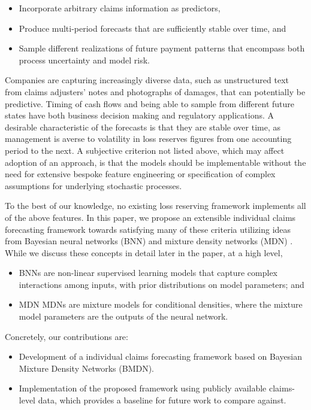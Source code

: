 \documentclass{article}
\begin{document}
\begin{itemize}
	\item Incorporate arbitrary claims information as predictors,
	\item Produce multi-period forecasts that are sufficiently stable over time, 
	and
	\item Sample different realizations of future payment patterns that encompass 
	both process uncertainty and model risk.
\end{itemize}
Companies are capturing increasingly diverse data, such as unstructured text 
from claims adjusters' notes and photographs of damages, that can potentially 
be predictive. Timing of cash flows and being able to sample from different 
future states have both business decision making and regulatory applications. A 
desirable characteristic of the forecasts is that they are stable over time, as 
management is averse to volatility in loss reserves figures from one accounting 
period to the next. A subjective criterion not listed above, which may affect
adoption of an approach, is that the models should be implementable without the
need for extensive bespoke feature engineering or specification of complex 
assumptions for underlying stochastic processes.

To the best of our knowledge, no existing loss reserving framework implements 
all of the above features. In this paper, we propose an extensible individual 
claims forecasting framework towards satisfying many of these criteria utilizing
ideas from Bayesian neural networks (BNN) \cite{nealBayesianLearning2012} and 
mixture density networks (MDN) \cite{bishopMixtureDensity1994}. While we discuss
these concepts in detail later in the paper, at a high level,

\begin{itemize}
  \item BNNs are non-linear supervised learning models that capture complex 
  interactions among inputs, with prior distributions on model parameters; and
  \item MDN MDNs are mixture models for conditional densities, where the mixture
  model parameters are the outputs of the neural network.
\end{itemize}
Concretely, our contributions are:

\begin{itemize}
	\item Development of a individual claims forecasting framework based on 
	Bayesian Mixture Density Networks (BMDN).
	\item Implementation of the proposed framework using publicly available 
	claims-level data, which provides a baseline for future work to compare 
	against.
\end{itemize}
\end{document}
